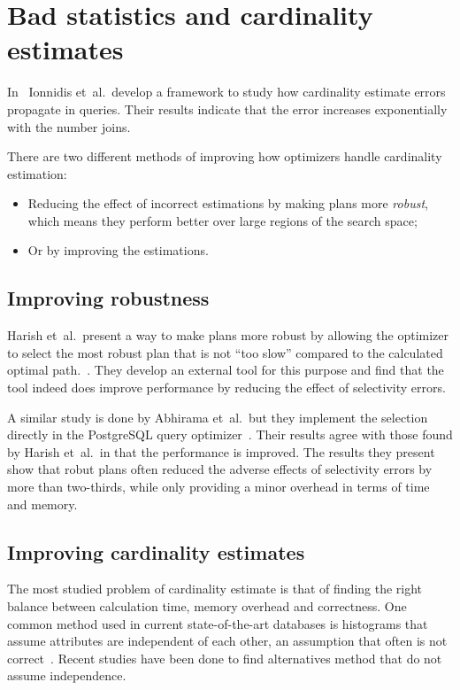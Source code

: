 \section{Bad statistics and cardinality estimates}
In~\cite{ioannidis_1991_propagation_otpoeitsojr} Ionnidis  et\ al.\ develop a
framework to study how cardinality estimate errors propagate in queries. Their
results indicate that the error increases exponentially with the number joins.

There are two different methods of improving how optimizers handle cardinality
estimation:
\begin{itemize}
\item Reducing the effect of incorrect estimations by making plans more
  \textit{robust}, which means they perform better over large regions of the
  search space;
\item Or by improving the estimations.
\end{itemize}

\subsection{Improving robustness}
Harish et\ al.\ present a way to make plans more robust by allowing the
optimizer to select the most robust plan that is not ``too slow'' compared to
the calculated optimal path.~\cite{harish_2008_identifying_irptpdr}. They
develop an external tool for this purpose and find that the tool indeed does
improve performance by reducing the effect of selectivity errors.

A similar study is done by Abhirama et\ al.\ but they implement the selection
directly in the PostgreSQL query
optimizer~\cite{abhirama_2010_stability_otsopcatcops}. Their results agree with
those found by Harish  et\ al.\ in that the performance is improved. The results
they present show that robut plans often reduced the adverse effects of
selectivity errors by more than two-thirds, while only providing a minor overhead in
terms of time and memory.

\subsection{Improving cardinality estimates}
The most studied problem of cardinality estimate is that of finding the right
balance between calculation time, memory overhead and correctness. One common
method used in current state-of-the-art databases is histograms that assume
attributes are independent of each other, an assumption that often is not
correct~\cite{ioannidis_2003_history_thoha}. Recent studies have been done to
find alternatives method that do not assume independence.

